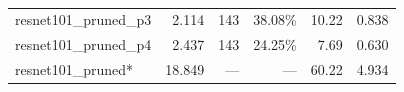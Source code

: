 \begin{table}[]
\begin{tabular}{@{}lrrrrr@{}}
resnet101\_pruned\_p3                                & 2.114                                                           & 143            & 38.08\%            & 10.22                                                             & 0.838                                                                      \\
resnet101\_pruned\_p4                                & 2.437                                                           & 143            & 24.25\%            & 7.69                                                              & 0.630                                                                      \\
resnet101\_pruned*                                   & 18.849                                                          & ---            & ---                & 60.22                                                             & 4.934                                                                      \\
\bottomrule
\end{tabular}
\caption{}
\label{tab:my-table}
\end{table}
